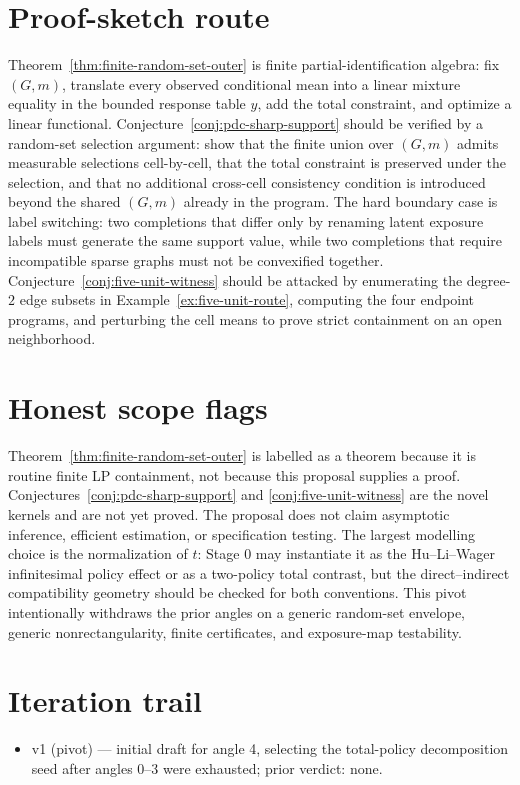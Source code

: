 \documentclass[11pt]{article}
\theoremstyle{definition}
\theoremstyle{plain}
\theoremstyle{remark}
\begin{document}
\section{Proof-sketch route}
Theorem~\ref{thm:finite-random-set-outer} is finite partial-identification
algebra: fix \((G,m)\), translate every observed conditional mean into a linear
mixture equality in the bounded response table \(y\), add the total constraint, and
optimize a linear functional.  Conjecture~\ref{conj:pdc-sharp-support} should be
verified by a random-set selection argument: show that the finite union over
\((G,m)\) admits measurable selections cell-by-cell, that the total constraint
is preserved under the selection, and that no additional cross-cell consistency
condition is introduced beyond the shared \((G,m)\) already in the program.
The hard boundary case is label switching: two completions that differ only by
renaming latent exposure labels must generate the same support value, while two
completions that require incompatible sparse graphs must not be convexified
together.  Conjecture~\ref{conj:five-unit-witness} should be attacked by
enumerating the degree-\(2\) edge subsets in Example~\ref{ex:five-unit-route},
computing the four endpoint programs, and perturbing the cell means to prove
strict containment on an open neighborhood.

\section{Honest scope flags}
Theorem~\ref{thm:finite-random-set-outer} is labelled as a theorem because it
is routine finite LP containment, not because this proposal supplies a proof.
Conjectures~\ref{conj:pdc-sharp-support} and \ref{conj:five-unit-witness} are
the novel kernels and are not yet proved.  The proposal does not claim
asymptotic inference, efficient estimation, or specification testing.  The
largest modelling choice is the normalization of \(t\): Stage 0 may instantiate
it as the Hu--Li--Wager infinitesimal policy effect or as a two-policy total
contrast, but the direct--indirect compatibility geometry should be checked for
both conventions.  This pivot intentionally withdraws the prior angles on a
generic random-set envelope, generic nonrectangularity, finite certificates, and
exposure-map testability.

\section{Iteration trail}
\begin{itemize}[leftmargin=*]
\item v1 (pivot) --- initial draft for angle 4, selecting the total-policy
decomposition seed after angles 0--3 were exhausted; prior verdict: none.
\end{itemize}
\end{document}
